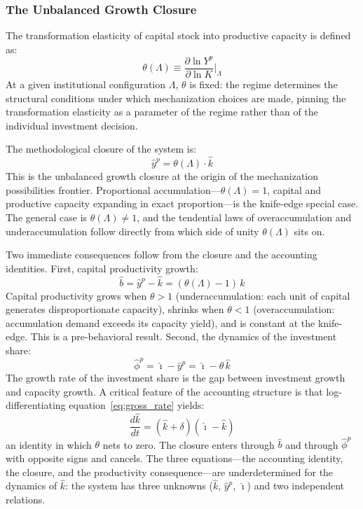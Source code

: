 \subsubsection{The Unbalanced Growth Closure}
\label{sec:unbalanced_growth_closure}

The transformation elasticity of capital stock into productive capacity is defined as:
%
\begin{equation}\label{eq:theta_def}
	\theta(\Lambda) \equiv \frac{\partial \ln Y^p}{\partial \ln K}\bigg|_\Lambda
\end{equation}
%
At a given institutional configuration $\Lambda$, $\theta$ is fixed: the regime determines the structural conditions under which mechanization choices are made, pinning the transformation elasticity as a parameter of the regime rather than of the individual investment decision.

The methodological closure of the system is:
%
\begin{equation}\label{eq:closure}
	\hat{y}^p = \theta(\Lambda) \cdot \hat{k}
\end{equation}
%
This is the unbalanced growth closure at the origin of the mechanization possibilities frontier. Proportional accumulation---$\theta(\Lambda) = 1$, capital and productive capacity expanding in exact proportion---is the knife-edge special case. The general case is $\theta(\Lambda) \neq 1$, and the tendential laws of overaccumulation and underaccumulation follow directly from which side of unity $\theta(\Lambda)$ sits on.

Two immediate consequences follow from the closure and the accounting identities. First, capital productivity growth:
%
\begin{equation}\label{eq:bhat}
	\hat{b} = \hat{y}^p - \hat{k} = (\theta(\Lambda) - 1)\,\hat{k}
\end{equation}
%
Capital productivity grows when $\theta > 1$ (underaccumulation: each unit of capital generates disproportionate capacity), shrinks when $\theta < 1$ (overaccumulation: accumulation demand exceeds its capacity yield), and is constant at the knife-edge. This is a pre-behavioral result. Second, the dynamics of the investment share:
%
\begin{equation}\label{eq:phihat}
	\hat{\phi}^p = \hat{\imath} - \hat{y}^p = \hat{\imath} - \theta\,\hat{k}
\end{equation}
%
The growth rate of the investment share is the gap between investment growth and capacity growth. A critical feature of the accounting structure is that log-differentiating equation~\eqref{eq:gross_rate} yields:
%
\begin{equation}\label{eq:khat_accel}
	\frac{d\hat{k}}{dt} = (\hat{k} + \delta)(\hat{\imath} - \hat{k})
\end{equation}
%
an identity in which $\theta$ nets to zero. The closure enters through $\hat{b}$ and through $\hat{\phi}^p$ with opposite signs and cancels. The three equations---the accounting identity, the closure, and the productivity consequence---are underdetermined for the dynamics of $\hat{k}$: the system has three unknowns ($\hat{k}$, $\hat{y}^p$, $\hat{\imath}$) and two independent relations.


